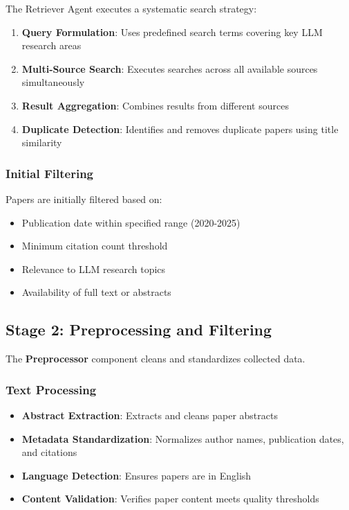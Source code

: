The Retriever Agent executes a systematic search strategy:
\begin{enumerate}
    \item \textbf{Query Formulation}: Uses predefined search terms covering key LLM research areas
    \item \textbf{Multi-Source Search}: Executes searches across all available sources simultaneously
    \item \textbf{Result Aggregation}: Combines results from different sources
    \item \textbf{Duplicate Detection}: Identifies and removes duplicate papers using title similarity
\end{enumerate}

\subsubsection{Initial Filtering}

Papers are initially filtered based on:
\begin{itemize}
    \item Publication date within specified range (2020-2025)
    \item Minimum citation count threshold
    \item Relevance to LLM research topics
    \item Availability of full text or abstracts
\end{itemize}

\subsection{Stage 2: Preprocessing and Filtering}

The \textbf{Preprocessor} component cleans and standardizes collected data.

\subsubsection{Text Processing}

\begin{itemize}
    \item \textbf{Abstract Extraction}: Extracts and cleans paper abstracts
    \item \textbf{Metadata Standardization}: Normalizes author names, publication dates, and citations
    \item \textbf{Language Detection}: Ensures papers are in English
    \item \textbf{Content Validation}: Verifies paper content meets quality thresholds
\end{itemize}

